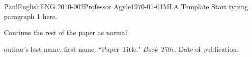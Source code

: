 \documentclass[12pt,letterpaper]{article}
\begin{document}
\begin{mla}{Paul}{English}{ENG 2010-002}{Professor Agyle}{\today}{MLA Template}
Start typing paragraph 1 here.

Continue the rest of the paper as normal.

\begin{workscited}

\bibent
author's last name, first name.  ``Paper Title."  \textit{Book Title}.  Date of publication.

\end{workscited}
\end{mla}
\end{document}
